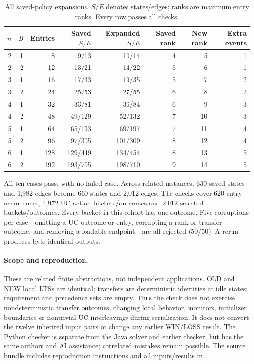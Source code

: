 \begin{table}[!htbp]
\caption{All saved-policy expansions. $S/E$ denotes states/edges; ranks are maximum entry ranks. Every row passes all checks.}\label{tab:saved-serial-expansion}
\centering\small
\begin{tabular}{@{}rrrrrrrr@{}}\toprule
$n$ & $B$ & Entries & Saved $S/E$ & Expanded $S/E$ & Saved rank & New rank & Extra events\\\midrule
2 & 1 & 8 & 9/13 & 10/14 & 4 & 5 & 1\\
2 & 2 & 12 & 13/21 & 14/22 & 5 & 6 & 1\\
3 & 1 & 16 & 17/33 & 19/35 & 5 & 7 & 2\\
3 & 2 & 24 & 25/53 & 27/55 & 6 & 8 & 2\\
4 & 1 & 32 & 33/81 & 36/84 & 6 & 9 & 3\\
4 & 2 & 48 & 49/129 & 52/132 & 7 & 10 & 3\\
5 & 1 & 64 & 65/193 & 69/197 & 7 & 11 & 4\\
5 & 2 & 96 & 97/305 & 101/309 & 8 & 12 & 4\\
6 & 1 & 128 & 129/449 & 134/454 & 8 & 13 & 5\\
6 & 2 & 192 & 193/705 & 198/710 & 9 & 14 & 5\\
\bottomrule\end{tabular}\end{table}
\FloatBarrier
All ten cases pass, with no failed case. Across related instances, 630 saved states and 1,982 edges become 660 states and 2,012 edges. The checks cover 620 entry occurrences, 1,972 UC action buckets/outcomes and 2,012 selected buckets/outcomes. Every bucket in this cohort has one outcome. Five corruptions per case---omitting a UC outcome or entry, corrupting a rank or transfer outcome, and removing a loadable endpoint---are all rejected (50/50). A rerun produces byte-identical outputs.

\paragraph{Scope and reproduction.}
These are related finite abstractions, not independent applications. OLD and NEW local LTSs are identical; transfers are deterministic identities at idle states; requirement and precedence sets are empty. Thus the check does not exercise nondeterministic transfer outcomes, changing local behavior, monitors, initializer boundaries or nontrivial UC interleavings during serialization. It does not convert the twelve inherited input pairs or change any earlier WIN/LOSS result. The Python checker is separate from the Java solver and earlier checker, but has the same authors and AI assistance; correlated mistakes remain possible. The source bundle includes reproduction instructions and all inputs/results in .
